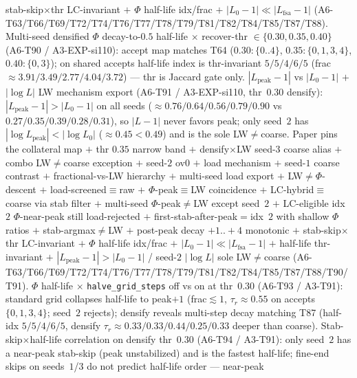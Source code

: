 \documentclass[11pt]{article}
\begin{document}
stab-skip$\times$thr LC-invariant $+$ $\Phi$ half-life idx/frac $+$
$|L_0{-}1|\ll|L_{\mathrm{fsa}}{-}1|$
(A6-T63/T66/T69/T72/T74/T76/T77/T78/T79/T81/T82/T84/T85/T87/T88).
Multi-seed densified $\Phi$ decay-to-$0.5$ half-life $\times$ recover-thr
$\in\{0.30,0.35,0.40\}$ (A6-T90 / A3-EXP-si110): accept map matches T64
($0.30{:}\{0..4\}$, $0.35{:}\{0,1,3,4\}$, $0.40{:}\{0,3\}$); on shared
accepts half-life index is thr-invariant $5/5/4/6/5$ (frac
$\approx 3.91/3.49/2.77/4.04/3.72$) --- thr is Jaccard gate only.
$|L_{\mathrm{peak}}{-}1|$ vs $|L_0{-}1|$ $+$ $|\log L|$ LW mechanism
export (A6-T91 / A3-EXP-si110, thr~$0.30$ densify):
$|L_{\mathrm{peak}}{-}1|>|L_0{-}1|$ on all seeds
($\approx 0.76/0.64/0.56/0.79/0.90$ vs $0.27/0.35/0.39/0.28/0.31$), so
$|L{-}1|$ never favors peak; only seed~$2$ has
$|\log L_{\mathrm{peak}}|<|\log L_0|$ ($\approx 0.45{<}0.49$) and is the
sole LW$\neq$coarse. Paper pins the collateral map $+$ thr $0.35$ narrow
band $+$ densify$\times$LW seed-$3$ coarse alias $+$ combo LW$\neq$coarse
exception $+$ seed-$2$ ov$0$ $+$ load mechanism $+$ seed-$1$ coarse
contrast $+$ fractional-vs-LW hierarchy $+$ multi-seed load export $+$
LW$\neq\Phi$-descent $+$ load-screened$\equiv$raw $+$
$\Phi$-peak$\equiv$LW coincidence $+$ LC-hybrid$\equiv$coarse via stab
filter $+$ multi-seed $\Phi$-peak$\neq$LW except seed~$2$ $+$
LC-eligible idx~$2$ $\Phi$-near-peak still load-rejected $+$
first-stab-after-peak${=}$idx~$2$ with shallow $\Phi$ ratios $+$
stab-argmax$\neq$LW $+$ post-peak decay ${+}1..{+}4$ monotonic $+$
stab-skip$\times$thr LC-invariant $+$ $\Phi$ half-life idx/frac $+$
$|L_0{-}1|\ll|L_{\mathrm{fsa}}{-}1|$ $+$ half-life thr-invariant $+$
$|L_{\mathrm{peak}}{-}1|>|L_0{-}1|$ / seed-$2$ $|\log L|$ sole LW$\neq$coarse
(A6-T63/T66/T69/T72/T74/T76/T77/T78/T79/T81/T82/T84/T85/T87/T88/T90/T91).
$\Phi$ half-life $\times$ \texttt{halve\_grid\_steps} off vs on at thr~$0.30$
(A6-T93 / A3-T91): standard grid collapses half-life to peak${+}1$
(frac$\lesssim 1$, $\tau_r\approx 0.55$ on accepts $\{0,1,3,4\}$; seed~$2$
rejects); densify reveals multi-step decay matching T87
(half-idx $5/5/4/6/5$, densify $\tau_r\approx 0.33/0.33/0.44/0.25/0.33$
deeper than coarse). Stab-skip$\times$half-life correlation on densify
thr~$0.30$ (A6-T94 / A3-T91): only seed~$2$ has a near-peak stab-skip
(peak unstabilized) and is the fastest half-life; fine-end skips on
seeds~$1$/$3$ do not predict half-life order --- near-peak
\end{document}
